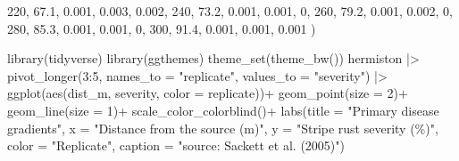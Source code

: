\documentclass[
  letterpaper,
  DIV=11,
  numbers=noendperiod]{scrreprt}
\newenvironment{Shaded}{\begin{snugshade}}{\end{snugshade}}
\newcommand{\AttributeTok}[1]{\textcolor[rgb]{0.40,0.45,0.13}{#1}}
\newcommand{\DecValTok}[1]{\textcolor[rgb]{0.68,0.00,0.00}{#1}}
\newcommand{\FloatTok}[1]{\textcolor[rgb]{0.68,0.00,0.00}{#1}}
\newcommand{\FunctionTok}[1]{\textcolor[rgb]{0.28,0.35,0.67}{#1}}
\newcommand{\NormalTok}[1]{\textcolor[rgb]{0.00,0.23,0.31}{#1}}
\newcommand{\SpecialCharTok}[1]{\textcolor[rgb]{0.37,0.37,0.37}{#1}}
\newcommand{\StringTok}[1]{\textcolor[rgb]{0.13,0.47,0.30}{#1}}
\begin{document}
\begin{Shaded}
\begin{Highlighting}[]
  \DecValTok{220}\NormalTok{,    }\FloatTok{67.1}\NormalTok{, }\FloatTok{0.001}\NormalTok{, }\FloatTok{0.003}\NormalTok{, }\FloatTok{0.002}\NormalTok{,}
  \DecValTok{240}\NormalTok{,    }\FloatTok{73.2}\NormalTok{, }\FloatTok{0.001}\NormalTok{, }\FloatTok{0.001}\NormalTok{,     }\DecValTok{0}\NormalTok{,}
  \DecValTok{260}\NormalTok{,    }\FloatTok{79.2}\NormalTok{, }\FloatTok{0.001}\NormalTok{, }\FloatTok{0.002}\NormalTok{,     }\DecValTok{0}\NormalTok{,}
  \DecValTok{280}\NormalTok{,    }\FloatTok{85.3}\NormalTok{, }\FloatTok{0.001}\NormalTok{, }\FloatTok{0.001}\NormalTok{,     }\DecValTok{0}\NormalTok{,}
  \DecValTok{300}\NormalTok{,    }\FloatTok{91.4}\NormalTok{, }\FloatTok{0.001}\NormalTok{, }\FloatTok{0.001}\NormalTok{, }\FloatTok{0.001}
\NormalTok{  )}
\end{Highlighting}
\end{Shaded}

\begin{Shaded}
\begin{Highlighting}[]
\FunctionTok{library}\NormalTok{(tidyverse)}
\FunctionTok{library}\NormalTok{(ggthemes)}
\FunctionTok{theme\_set}\NormalTok{(}\FunctionTok{theme\_bw}\NormalTok{())}
\NormalTok{hermiston }\SpecialCharTok{|\textgreater{}} 
  \FunctionTok{pivot\_longer}\NormalTok{(}\DecValTok{3}\SpecialCharTok{:}\DecValTok{5}\NormalTok{, }\AttributeTok{names\_to =} \StringTok{"replicate"}\NormalTok{, }\AttributeTok{values\_to =} \StringTok{"severity"}\NormalTok{) }\SpecialCharTok{|\textgreater{}} 
  \FunctionTok{ggplot}\NormalTok{(}\FunctionTok{aes}\NormalTok{(dist\_m, severity, }\AttributeTok{color =}\NormalTok{ replicate))}\SpecialCharTok{+}
  \FunctionTok{geom\_point}\NormalTok{(}\AttributeTok{size =} \DecValTok{2}\NormalTok{)}\SpecialCharTok{+}
  \FunctionTok{geom\_line}\NormalTok{(}\AttributeTok{size =} \DecValTok{1}\NormalTok{)}\SpecialCharTok{+}
  \FunctionTok{scale\_color\_colorblind}\NormalTok{()}\SpecialCharTok{+}
  \FunctionTok{labs}\NormalTok{(}\AttributeTok{title =} \StringTok{"Primary disease gradients"}\NormalTok{, }
       \AttributeTok{x =} \StringTok{"Distance from the source (m)"}\NormalTok{,}
       \AttributeTok{y =} \StringTok{"Stripe rust severity (\%)"}\NormalTok{,}
       \AttributeTok{color =} \StringTok{"Replicate"}\NormalTok{,}
       \AttributeTok{caption =} \StringTok{"source: Sackett et al. (2005)"}\NormalTok{)}
\end{Highlighting}
\end{Shaded}
\end{document}

